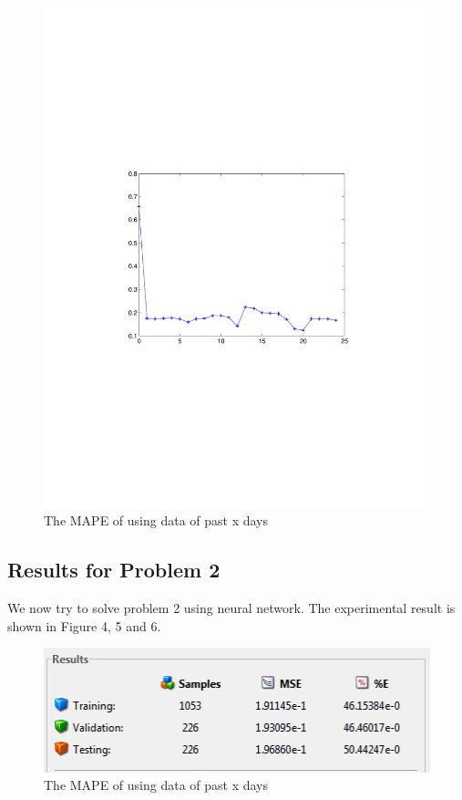 \documentclass{sig-alternate}
\begin{document}
\begin{figure}[ht]
\centering
\includegraphics[scale = 0.4, trim = 350 250 350 250]{pic/lg.pdf}
\caption{The MAPE of using data of past x days}
\end{figure}





\subsection{Results for Problem 2}
We now try to solve problem 2 using neural network. The experimental result is shown in Figure 4, 5 and 6.
\begin{figure}[ht]
\centering
\includegraphics[scale = 0.8]{pic/cl3.png}
\caption{The MAPE of using data of past x days}
\end{figure}
\end{document}

